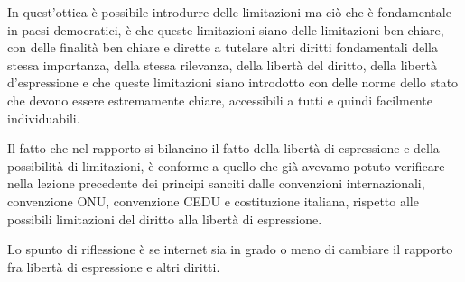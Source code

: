  In quest'ottica è possibile introdurre delle limitazioni ma ciò che è fondamentale in paesi democratici, è che queste limitazioni siano delle limitazioni ben chiare, con delle finalità ben chiare e dirette a tutelare altri diritti fondamentali della stessa importanza, della stessa rilevanza, della libertà del diritto, della libertà d'espressione e che queste limitazioni siano introdotto con delle norme dello stato che devono essere estremamente chiare, accessibili a tutti e quindi facilmente individuabili.\par
 Il fatto che nel rapporto si bilancino il fatto della libertà di espressione e della possibilità di limitazioni, è conforme a quello che già avevamo potuto verificare nella lezione precedente dei principi sanciti dalle convenzioni internazionali, convenzione ONU, convenzione CEDU e costituzione italiana, rispetto alle possibili limitazioni del diritto alla libertà di espressione.\par
 Lo spunto di riflessione è se internet sia in grado o meno di cambiare il rapporto fra libertà di espressione e altri diritti.
